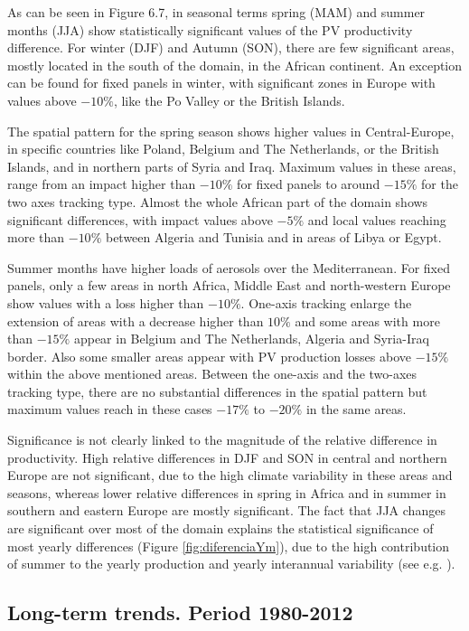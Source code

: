 As can be seen in Figure 6.7, in seasonal terms spring (MAM) and summer months (JJA) show statistically significant values of the PV productivity difference. For winter (DJF) and Autumn (SON), there are few significant areas, mostly located in the south of the domain, in the African continent. An exception can be found for fixed panels in winter, with significant zones in Europe with values above $-10\%$, like the Po Valley or the British Islands. 

The spatial pattern for the spring season shows higher values in Central-Europe, in specific countries like Poland, Belgium and The Netherlands, or the British Islands, and in northern parts of Syria and Iraq. Maximum values in these areas, range from an impact higher than $-10\%$ for fixed panels to around $-15\%$ for the two axes tracking type. Almost the whole African part of the domain shows significant differences, with impact values above $-5\%$ and local values reaching more than $-10\%$ between Algeria and Tunisia and in areas of Libya or Egypt. 

Summer months have higher loads of aerosols over the Mediterranean. For fixed panels, only a few areas in north Africa, Middle East and north-western Europe show values with a loss higher than $-10\%$. One-axis tracking enlarge the extension of areas with a decrease higher than $10\%$ and some areas with more than $-15\%$ appear in Belgium and The Netherlands, Algeria and Syria-Iraq border. Also some smaller areas appear with PV production losses above $-15\%$ within the above mentioned areas. Between the one-axis and the two-axes tracking type, there are no substantial differences in the spatial pattern but maximum values reach in these cases $-17\%$ to $-20\%$ in the same areas.

Significance is not clearly linked to the magnitude of the relative difference in productivity. High relative differences in DJF and SON in central and northern Europe are not significant, due to the high climate variability in these areas and seasons, whereas lower relative differences in spring in Africa and in summer in southern and eastern Europe are mostly significant. The fact that JJA changes are significant over most of the domain explains the statistical significance of most yearly differences (Figure \ref{fig:diferenciaYm}), due to the high contribution of summer to the yearly production and yearly interannual variability (see e.g. \cite{Gil2015}).


\subsection{Long-term trends. Period 1980-2012}


